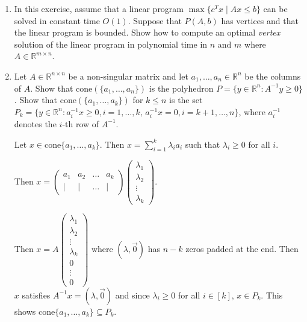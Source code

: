 \documentclass[11pt]{article}
\newcommand{\setR}{\mathbb{R}}
\renewcommand{\leq}{\leqslant}
\renewcommand{\geq}{\geqslant}
\newcommand{\cone}{\mathrm{cone}}
\begin{document}
\begin{enumerate}[1)]
\begin{solution}
\end{solution}



\item In this exercise, assume that a linear program $\max\{c^Tx \mid
  Ax\leq b \}$ can be solved in constant time $O(1)$. Suppose that $P(A,b)$
  has vertices and that the linear program is bounded. Show how to
  compute an optimal \emph{vertex} solution of the linear
  program in polynomial time in $n$ and $m$ where $A \in \mathbb{R}^{m \times n}$. 
  
  
  
  
  \item Let $A \in \setR^{n\times n}$ be a non-singular matrix and let
  $a_1,\ldots,a_n\in \setR^n$ be the columns of $A$.  Show that
  $\cone(\{a_1,\ldots,a_n\})$ is the polyhedron $P = \{ y \in \setR^n \colon
  A^{-1} y\geq0\}$. \label{conv:item:3} Show that $\cone(\{a_1,\ldots,a_k\})$ for
  $k\leq n$ is the set $P_k = \{y \in \setR^n \colon
  a_i^{-1} x\geq0, i=1,\ldots,k, \, a_i^{-1}x = 0, i=k+1,\ldots,n\}$, where
  $a_i^{-1}$ denotes the $i$-th row of $A^{-1}$. 
  
  
  \begin{solution}
  Let $x \in \cone\{a_1, \hdots, a_k\}$. Then $x = \displaystyle\sum_{i =1}^k \lambda_i a_i$ such that $\lambda_i \geq 0$ for all $i$. 
  
  
  Then $x = \begin{pmatrix}a_1 & a_2 & \hdots & a_k \\ |&|&\hdots &|\end{pmatrix} \begin{pmatrix}\lambda_1 \\ \lambda_2 \\ \vdots \\ \lambda_k\end{pmatrix}$.
  
  Then $x = A \begin{pmatrix} \lambda_1 \\ \lambda_2 \\ \vdots \\ \lambda_k \\ 0 \\ \vdots \\ 0\end{pmatrix}$ where $(\lambda, \vec{0})$ has $n-k$ zeros padded at the end. Then $x$ satisfies $A^{-1}x = (\lambda,  \vec{0})$ and since $\lambda_i \geq 0$ for all $i \in [k]$, $ x \in P_k$. This shows $\cone\{a_1, \hdots, a_k\} \subseteq P_k$. 
  

\end{solution}
\end{enumerate}
\end{document}

